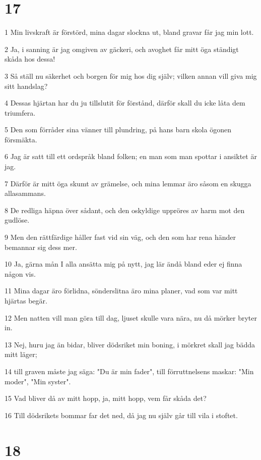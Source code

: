 \chapter{17}

\par 1 Min livskraft är förstörd, mina dagar slockna ut, bland gravar får jag min lott.
\par 2 Ja, i sanning är jag omgiven av gäckeri, och avoghet får mitt öga ständigt skåda hos dessa!
\par 3 Så ställ nu säkerhet och borgen för mig hos dig själv; vilken annan vill giva mig sitt handslag?
\par 4 Dessas hjärtan har du ju tillslutit för förstånd, därför skall du icke låta dem triumfera.
\par 5 Den som förråder sina vänner till plundring, på hans barn skola ögonen försmäkta.
\par 6 Jag är satt till ett ordspråk bland folken; en man som man spottar i ansiktet är jag.
\par 7 Därför är mitt öga skumt av grämelse, och mina lemmar äro såsom en skugga allasammans.
\par 8 De redliga häpna över sådant, och den oskyldige uppröres av harm mot den gudlöse.
\par 9 Men den rättfärdige håller fast vid sin väg, och den som har rena händer bemannar sig dess mer.
\par 10 Ja, gärna mån I alla ansätta mig på nytt, jag lär ändå bland eder ej finna någon vis.
\par 11 Mina dagar äro förlidna, sönderslitna äro mina planer, vad som var mitt hjärtas begär.
\par 12 Men natten vill man göra till dag, ljuset skulle vara nära, nu då mörker bryter in.
\par 13 Nej, huru jag än bidar, bliver dödsriket min boning, i mörkret skall jag bädda mitt läger;
\par 14 till graven måste jag säga: "Du är min fader", till förruttnelsens maskar: "Min moder", "Min syster".
\par 15 Vad bliver då av mitt hopp, ja, mitt hopp, vem får skåda det?
\par 16 Till dödsrikets bommar far det ned, då jag nu själv går till vila i stoftet.

\chapter{18}

